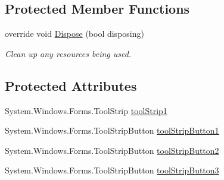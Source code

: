 \subsection*{Protected Member Functions}
\begin{DoxyCompactItemize}
\item 
override void \hyperlink{class__7___doroshenko__forms2__is52_1_1_task__3_a71c3cdfc7a05accc3dbf0dc1dc342143}{Dispose} (bool disposing)
\begin{DoxyCompactList}\small\item\em Clean up any resources being used. \end{DoxyCompactList}\end{DoxyCompactItemize}
\subsection*{Protected Attributes}
\begin{DoxyCompactItemize}
\item 
System.\+Windows.\+Forms.\+Tool\+Strip \hyperlink{class__7___doroshenko__forms2__is52_1_1_task__3_a327f1aa047561514141fc05287951926}{tool\+Strip1}
\item 
System.\+Windows.\+Forms.\+Tool\+Strip\+Button \hyperlink{class__7___doroshenko__forms2__is52_1_1_task__3_a57d16f8c7a979c50d45122c280410a08}{tool\+Strip\+Button1}
\item 
System.\+Windows.\+Forms.\+Tool\+Strip\+Button \hyperlink{class__7___doroshenko__forms2__is52_1_1_task__3_adf509910ac6fb597eac9a2b93fd88520}{tool\+Strip\+Button2}
\item 
System.\+Windows.\+Forms.\+Tool\+Strip\+Button \hyperlink{class__7___doroshenko__forms2__is52_1_1_task__3_ac3829d4753dd356088f5b0934ed9a168}{tool\+Strip\+Button3}
\end{DoxyCompactItemize}
